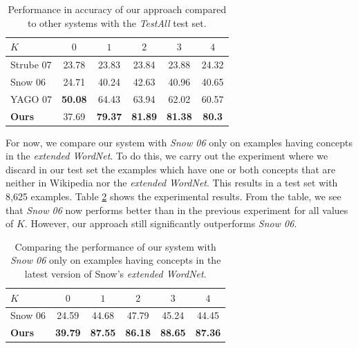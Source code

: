 \begin{table}[hp]
\begin{center}
\begin{tabular}{|l|c|c|c|c|c|}
  \hline
  $K$ &    $0$  &    $1$  &    $2$  &    $3$  &    $4$  \\
  \hline
  \hline
  Strube 07     &  23.78  &  23.83  &  23.84  &  23.88  &  24.32  \\
  \hline
  Snow 06       &  24.71  &  40.24  &  42.63  &  40.96  &  40.65  \\
  \hline
  YAGO 07 & \textbf{50.08} & 64.43 & 63.94 & 62.02 & 60.57 \\
  \hline
  \textbf{Ours} &  37.69  &  \textbf{79.37}  &  \textbf{81.89}  &  \textbf{81.38}  &  \textbf{80.3}  \\
  \hline
\end{tabular}
\end{center}
\caption{Performance in accuracy of our approach compared to other systems with the {\em TestAll} test set.}
\label{tab:exp-compare-testall}
\end{table}

For now, we compare our system with {\em Snow 06} only on
examples having concepts in the {\em extended WordNet}. To do this, we
carry out the experiment where we discard in our test set the examples
which have one or both concepts that are neither in Wikipedia nor the
{\em extended WordNet}. This results in a test set with 8,625
examples. Table \ref{tab:exp-compare-inwn} shows the experimental
results. From the table, we see that {\em Snow 06} now performs better
than in the previous experiment for all values of $K$. However, our
approach still significantly outperforms {\em Snow 06}.

\begin{table}[t]
\begin{center}
\begin{tabular}{|l|c|c|c|c|c|}
  \hline
  $K$              &    $0$  &    $1$  &    $2$  &    $3$  &    $4$  \\
  \hline
  \hline
  Snow 06  &  24.59  &  44.68  &  47.79  &  45.24  &  44.45  \\
  \hline
  \textbf{Ours}  &  \textbf{39.79}  &  \textbf{87.55}  &  \textbf{86.18}  &  \textbf{88.65}  &  \textbf{87.36}  \\
  \hline
\end{tabular}
\end{center}
\caption{Comparing the performance of our system with {\em Snow 06} only on examples having concepts in the latest version of Snow's {\em extended WordNet}.}
\label{tab:exp-compare-inwn}
\end{table}

